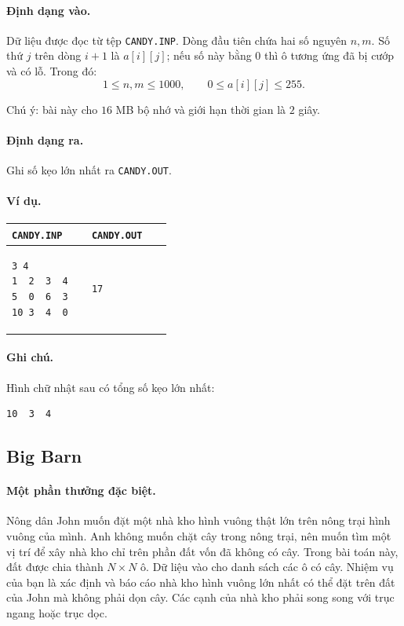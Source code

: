 \documentclass[11pt]{article}
\begin{document}
\paragraph{Định dạng vào.}
Dữ liệu được đọc từ tệp \texttt{CANDY.INP}. Dòng đầu tiên chứa hai số nguyên
\(n,m\). Số thứ \(j\) trên dòng \(i+1\) là \(a[i][j]\); nếu số này bằng \(0\)
thì ô tương ứng đã bị cướp và có lỗ. Trong đó:
\[
  1\le n,m\le 1000,\qquad 0\le a[i][j]\le 255.
\]

Chú ý: bài này cho \(16\) MB bộ nhớ và giới hạn thời gian là \(2\) giây.

\paragraph{Định dạng ra.}
Ghi số kẹo lớn nhất ra \texttt{CANDY.OUT}.

\paragraph{Ví dụ.}
\begin{center}
\begin{tabular}{p{0.42\linewidth}|p{0.42\linewidth}}
\texttt{CANDY.INP} & \texttt{CANDY.OUT} \\
\hline
\begin{verbatim}
3 4
1  2  3  4
5  0  6  3
10 3  4  0
\end{verbatim}
&
\begin{verbatim}
17
\end{verbatim}
\end{tabular}
\end{center}

\paragraph{Ghi chú.}
Hình chữ nhật sau có tổng số kẹo lớn nhất:
\begin{verbatim}
10  3  4
\end{verbatim}

\subsection{Big Barn}

\paragraph{Một phần thưởng đặc biệt.}
Nông dân John muốn đặt một nhà kho hình vuông thật lớn trên nông trại hình
vuông của mình. Anh không muốn chặt cây trong nông trại, nên muốn tìm một vị
trí để xây nhà kho chỉ trên phần đất vốn đã không có cây. Trong bài toán này,
đất được chia thành \(N\times N\) ô. Dữ liệu vào cho danh sách các ô có cây.
Nhiệm vụ của bạn là xác định và báo cáo nhà kho hình vuông lớn nhất có thể đặt
trên đất của John mà không phải dọn cây. Các cạnh của nhà kho phải song song
với trục ngang hoặc trục dọc.
\end{document}
